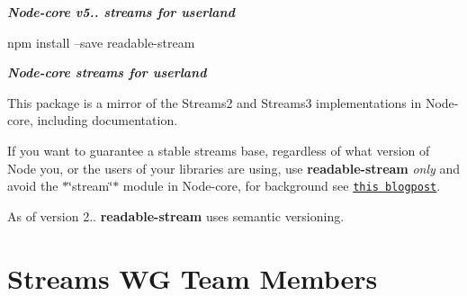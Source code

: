 {\itshape {\bfseries Node-\/core v5.. streams for userland}} \href{https://travis-ci.org/nodejs/readable-stream}{\tt }

\href{https://nodei.co/npm/readable-stream/}{\tt } \href{https://nodei.co/npm/readable-stream/}{\tt }

\href{https://saucelabs.com/u/readable-stream}{\tt }


\begin{DoxyCode}
npm install --save readable-stream
\end{DoxyCode}


{\itshape {\bfseries Node-\/core streams for userland}}

This package is a mirror of the Streams2 and Streams3 implementations in Node-\/core, including documentation.

If you want to guarantee a stable streams base, regardless of what version of Node you, or the users of your libraries are using, use {\bfseries readable-\/stream} {\itshape only} and avoid the $\ast$\char`\"{}stream\char`\"{}$\ast$ module in Node-\/core, for background see \href{http://r.va.gg/2014/06/why-i-dont-use-nodes-core-stream-module.html}{\tt this blogpost}.

As of version 2.. {\bfseries readable-\/stream} uses semantic versioning.

\section*{Streams WG Team Members}


